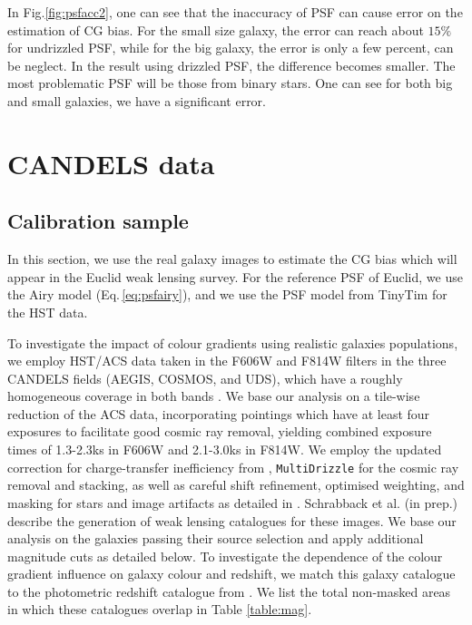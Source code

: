 \documentclass[useAMS,usenatbib]{mn2e}
\begin{document}
%
In Fig.\ref{fig:psfacc2}, one can see that the inaccuracy of PSF can
cause error on the estimation of CG bias. For the small size galaxy,
the error can reach about $15\%$ for undrizzled PSF, while for the big
galaxy, the error is only a few percent, can be neglect. In the result
using drizzled PSF, the difference becomes smaller. The most
problematic PSF will be those from binary stars. One can see for both
big and small galaxies, we have a significant error.

\section{CANDELS data}

\subsection{Calibration sample}
In this section, we use the real galaxy images to estimate the CG bias
which will appear in the Euclid weak lensing survey. For the reference
PSF of Euclid, we use the Airy model (Eq.\,\ref{eq:psfairy}), and we use
the PSF model from TinyTim for the HST data.

To investigate the impact of colour gradients using realistic galaxies
populations, we employ HST/ACS data taken in the F606W and F814W
filters in the three CANDELS fields (AEGIS, COSMOS, and UDS), which have
a roughly homogeneous coverage in both bands
\citep[see][]{davis2007,grogin2011,koekemoer11}. We base our analysis
on a tile-wise reduction of the ACS data, incorporating pointings
which have at least four exposures to facilitate good cosmic ray
removal, yielding combined exposure times of 1.3-2.3ks in F606W and
2.1-3.0ks in F814W.  We employ the updated correction for
charge-transfer inefficiency from \cite{massey2014},
\texttt{MultiDrizzle} \citep{koekemoer2003} for the cosmic ray removal
and stacking, as well as careful shift refinement, optimised
weighting, and masking for stars and image artifacts as detailed in
\cite{schrabback2010}.  Schrabback et al. (in prep.) describe the
generation of weak lensing catalogues for these images.  We base our
analysis on the galaxies passing their source selection and apply
additional magnitude cuts as detailed below. To investigate the
dependence of the colour gradient influence on galaxy colour and
redshift, we match this galaxy catalogue to the photometric redshift
catalogue from \cite{skelton14}.  We list the total non-masked areas
in which these catalogues overlap in Table \ref{table:mag}.
\end{document}
